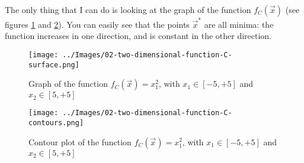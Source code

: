     The only thing that I can do is looking at the graph of the function \(f_C(\vec{x})\) (see figures \ref{two-dimensional-function-C-surface} and \ref{two-dimensional-function-C-contours}). You can easily see that the points \(\vec{x}^*\) are all minima: the function increases in one direction, and is constant in the other direction.
    \begin{figure}
        \centering
        \texttt{[image: ../Images/02-two-dimensional-function-C-surface.png]}
        \caption{Graph of the function \(f_C(\vec{x}) = x_{1}^{2}\), with \(x_1 \in [-5, +5]\) and \(x_2 \in [5, +5]\)}
        \label{two-dimensional-function-C-surface}
    \end{figure}
    \begin{figure}
        \centering
        \texttt{[image: ../Images/02-two-dimensional-function-C-contours.png]}
        \caption{Contour plot of the function \(f_C(\vec{x}) = x_{1}^{2}\), with \(x_1 \in [-5, +5]\) and \(x_2 \in [5, +5]\)}
        \label{two-dimensional-function-C-contours}
    \end{figure}